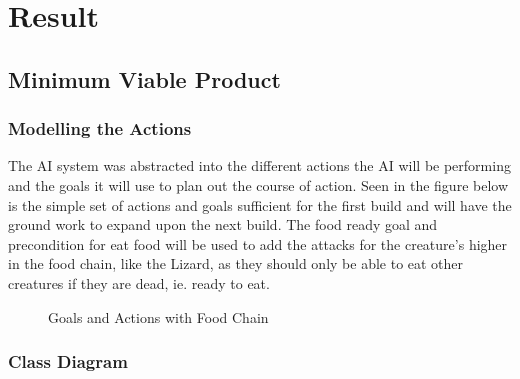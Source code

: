 \documentclass[12pt]{report}
\begin{document}
\chapter{Result}


\section{Minimum Viable Product}

\subsection{Modelling the Actions}
The AI system was abstracted into the different actions the AI will be performing and the goals it will use to plan out the course of action. Seen in the figure below is the simple set of actions and goals sufficient for the first build and will have the ground work to expand upon the next build. The food ready goal and precondition for eat food will be used to add the attacks for the creature's higher in the food chain, like the Lizard, as they should only be able to eat other creatures if they are dead, ie. ready to eat.

\begin{figure}[H]
    \centering
    \caption{Goals and Actions with Food Chain}
\end{figure}

\subsection{Class Diagram}
\end{document}
